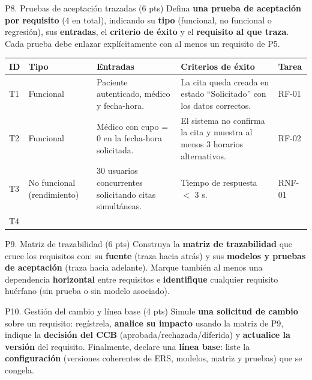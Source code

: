 \documentclass[11pt,a4paper,oneside]{article}
\begin{document}
	\vspace{10pt}
	
	\begin{tarea}{P8. Pruebas de aceptaci\'on trazadas \hfill (6 pts)}
		Defina \textbf{una prueba de aceptaci\'on por requisito} (4 en total), indicando su \textbf{tipo} (funcional, no funcional o regresi\'on), sus \textbf{entradas}, el \textbf{criterio de \'exito} y el \textbf{requisito al que traza}. Cada prueba debe enlazar expl\'icitamente con al menos un requisito de P5.
	\end{tarea}
	
		\vspace{10pt}
	
	\begin{center}\small
		\begin{tabularx}{\linewidth}{|L{0.8cm}|L{1.8cm}|X|X|L{1.3cm}|}
			\hline
			\textbf{ID} & \textbf{Tipo} & \textbf{Entradas} & \textbf{Criterios de \'exito} & \textbf{Tarea}\\
			\hline
			T1 & Funcional & Paciente autenticado, m\'edico y fecha-hora. & La cita queda creada en estado ``Solicitado'' con los datos correctos. & RF-01\\
			\hline
			T2 & Funcional & M\'edico con cupo = 0 en la fecha-hora solicitada. & El sistema no confirma la cita y muestra al menos 3 horarios alternativos. & RF-02\\
			\hline
			T3 & No funcional (rendimiento) & 30 usuarios concurrentes solicitando citas simult\'aneas. & Tiempo de respuesta $<$ 3 s. & RNF-01\\
			\hline
			T4 & & & & \\
			\hline
		\end{tabularx}
	\end{center}
	
	\newpage
	
	\begin{tarea}{P9. Matriz de trazabilidad \hfill (6 pts)}
		Construya la \textbf{matriz de trazabilidad} que cruce los requisitos con: su \textbf{fuente} (traza hacia atr\'as) y sus \textbf{modelos y pruebas de aceptaci\'on} (traza hacia adelante). Marque tambi\'en al menos una dependencia \textbf{horizontal} entre requisitos e \textbf{identifique} cualquier requisito hu\'erfano (sin prueba o sin modelo asociado).
	\end{tarea}
	
	
	\begin{tarea}{P10. Gesti\'on del cambio y l\'inea base \hfill (4 pts)}
		Simule \textbf{una solicitud de cambio} sobre un requisito: reg\'istrela, \textbf{analice su impacto} usando la matriz de P9, indique la \textbf{decisi\'on del CCB} (aprobada/rechazada/diferida) y \textbf{actualice la versi\'on} del requisito. Finalmente, declare una \textbf{l\'inea base}: liste la \textbf{configuraci\'on} (versiones coherentes de ERS, modelos, matriz y pruebas) que se congela.
	\end{tarea}
	
\end{document}
